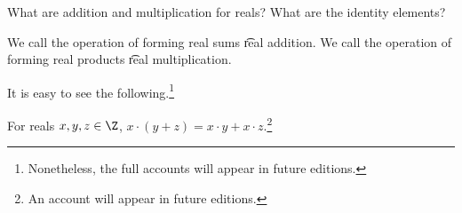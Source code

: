 

What are addition and multiplication for reals?
What are the identity elements?


We call the operation of forming real sums \t{real addition}.
We call the operation of forming real products \t{real multiplication}.


It is easy to see the following.\footnote{Nonetheless, the full accounts will appear in future editions.}


\begin{proposition}
  For reals $x, y, z \in \Z$, $x \cdot (y + z) = x\cdot y + x\cdot z$.\footnote{An account will appear in future editions.}
\end{proposition}

\blankpage
